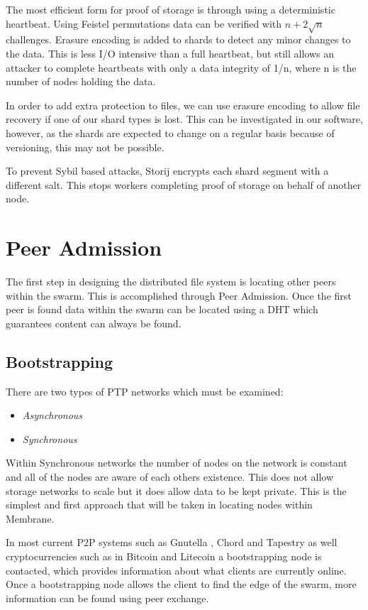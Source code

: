 \documentclass[a4paper,11pt, twocolumn]{report}
\begin{document}
The most efficient form for proof of storage is through using a deterministic heartbeat. Using Feistel permutations data can be verified with $n + 2 \sqrt{n}$ challenges. Erasure encoding is added to shards to detect any minor changes to the data. This is less I/O intensive than a full heartbeat, but still allows an attacker to complete heartbeats with only a data integrity of 1/n, where n is the number of nodes holding the data.

In order to add extra protection to files, we can use erasure encoding to allow file recovery if one of our shard types is lost. This can be investigated in our software, however, as the shards are expected to change on a regular basis because of versioning, this may not be possible.

To prevent Sybil based attacks, Storij encrypts each shard segment with a different salt. This stops workers completing proof of storage on behalf of another node.



\section{Peer Admission}
The first step in designing the distributed file system is locating other peers within the swarm. This is accomplished through Peer Admission. Once the first peer is found data within the swarm can be located using a DHT which guarantees content can always be found.

\subsection{Bootstrapping}

There are two types of PTP networks which must be examined:
\begin{itemize}
 \item \emph{Asynchronous}
 \item \emph{Synchronous}
\end{itemize}

Within Synchronous networks the number of nodes on the network is constant and all of the nodes are aware of each others existence. This does not allow storage networks to scale but it does allow data to be kept private. \citep{saxena2003admission} This is the simplest and first approach that will be taken in locating nodes within Membrane.

In most current P2P systems such as Gnutella \citep{klingberg2002gnutella}, Chord and Tapestry as well cryptocurrencies such as in Bitcoin and Litecoin a bootstrapping node is contacted, which provides information about what clients are currently online. Once a bootstrapping node allows the client to find the edge of the swarm, more information can be found using peer exchange.
\end{document}
